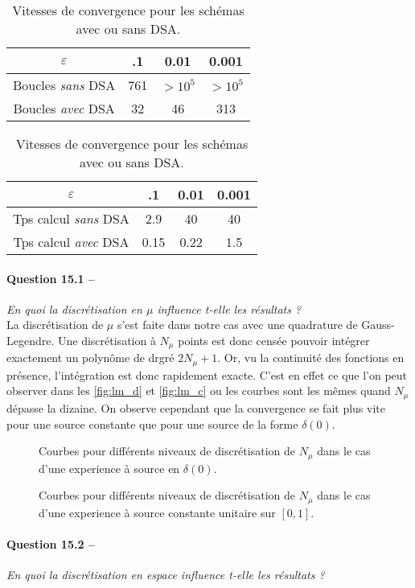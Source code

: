 \documentclass[11pt,a4paper]{article}
\newcommand{\question}[2]{\paragraph{Question #1 --}\hspace{-7pt}\textit{#2} \\}
\begin{document}
\begin{table}
  \centering
  \begin{tabular}{c|ccc}
    $\varepsilon $ & .1 & 0.01 & 0.001 \\
    \hline
    Boucles \textit{sans} DSA & 761 & $>10^5$ & $>10^5$ \\
    Boucles \textit{avec} DSA & 32 & 46 & 313 \\
  \end{tabular}
  \hspace{50pt}
  \begin{tabular}{c|ccc}
    $\varepsilon $ & .1 & 0.01 & 0.001 \\
    \hline
    Tps calcul \textit{sans} DSA & 2.9 & 40 & 40 \\
    Tps calcul \textit{avec} DSA & 0.15 & 0.22 & 1.5 \\
  \end{tabular}
\caption{Vitesses de convergence pour les schémas avec ou sans DSA.}
\label{tab:DSA}
\end{table}


\question{15.1}{En quoi la discrétisation en $\mu$ influence t-elle les résultats ?}

La discrétisation de $\mu$ s'est faite dans notre cas avec une quadrature de Gauss-Legendre. Une discrétisation à $N_\mu$ points est donc censée pouvoir intégrer exactement un polynôme de drgré $2N_\mu+1$. Or, vu la continuité des fonctions en présence, l'intégration est donc rapidement exacte. C'est en effet ce que l'on peut observer dans les \autoref{fig:lm_d} et \autoref{fig:lm_c} ou les courbes sont les mêmes quand $N_\mu$ dépasse la dizaine. On observe cependant que la convergence se fait plus vite pour une source constante que pour une source de la forme $\delta(0)$.
\begin{figure}
  \centering
  
  \caption{Courbes pour différents niveaux de discrétisation de $N_\mu$ dans le cas d'une experience à source en $\delta(0)$.}
  \label{fig:lm_d}
\end{figure}

\begin{figure}
  \centering
  
  \caption{Courbes pour différents niveaux de discrétisation de $N_\mu$ dans le cas d'une experience à source constante unitaire sur $[0,1]$.}
  \label{fig:lm_c}
\end{figure}



\question{15.2}{En quoi la discrétisation en espace influence t-elle les résultats ?}
\end{document}
